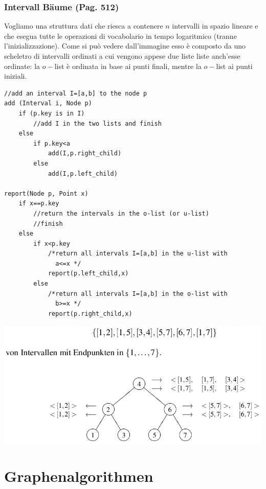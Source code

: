 \documentclass[a4paper]{book}
\newcommand{\lstIndent}{4}
\begin{document}
\subsection{Intervall Bäume (Pag. 512)}
Vogliamo una struttura dati che riesca a contenere $n$ intervalli in spazio lineare e che esegua tutte le operazioni di vocabolario in tempo logaritmico (tranne l'inizializzazione). Come si può vedere dall'immagine esso è composto da uno scheletro di intervalli ordinati a cui vengono appese due liste liste anch'esse ordinate: la $o-$list è ordinata in base ai punti finali, mentre la $o-$list ai punti iniziali.
\begin{lstlisting}[tabsize=\lstIndent]
//add an interval I=[a,b] to the node p
add (Interval i, Node p)
	if (p.key is in I)
		//add I in the two lists and finish
	else
		if p.key<a
			add(I,p.right_child)
		else
			add(I,p.left_child)	
			
report(Node p, Point x)
	if x==p.key
		//return the intervals in the o-list (or u-list)
		//finish
	else
		if x<p.key
			/*return all intervals I=[a,b] in the u-list with			
			  a<=x */
			report(p.left_child,x)
		else	
			/*return all intervals I=[a,b] in the o-list with			
			  b>=x */ 
			report(p.right_child,x)  
\end{lstlisting}
\begin{center}
\includegraphics[scale=0.4]{Figures/rangetree.png}
\end{center}

\chapter{Graphenalgorithmen}
\end{document}
